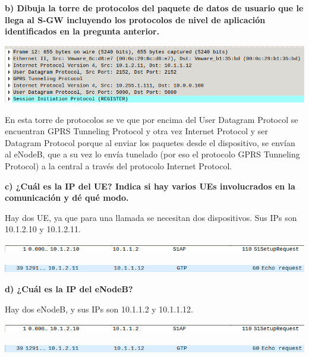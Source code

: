 \documentclass{article}
\begin{document}
\textbf{b) Dibuja la torre de protocolos del paquete de datos de usuario que le llega al S-GW
incluyendo los protocolos de nivel de aplicación identificados en la pregunta anterior.}

\begin{center}
\includegraphics[scale=0.3]{images/protocolos.png}
\end{center}

En esta torre de protocolos se ve que por encima del User Datagram Protocol se encuentran GPRS Tunneling Protocol y otra vez Internet Protocol y ser Datagram Protocol porque al enviar los paquetes desde el dispositivo, se envían al eNodeB, que a su vez lo envía tunelado (por eso el protocolo GPRS Tunneling Protocol) a la central a través del protocolo Internet Protocol.

\textbf{c) ¿Cuál es la IP del UE? Indica si hay varios UEs involucrados en la comunicación y dé qué modo.}

Hay dos UE, ya que para una llamada se necesitan dos dispositivos. Sus IPs son 10.1.2.10 y 10.1.2.11.

\begin{center}
\includegraphics[scale=0.3]{images/UE1.png}
\end{center}

\begin{center}
\includegraphics[scale=0.3]{images/UE2.png}
\end{center}

\textbf{d) ¿Cuál es la IP del eNodeB?}

Hay dos eNodeB, y sus IPs son 10.1.1.2 y 10.1.1.12.

\begin{center}
\includegraphics[scale=0.3]{images/UE1.png}
\end{center}

\begin{center}
\includegraphics[scale=0.3]{images/UE2.png}
\end{center}
\end{document}
